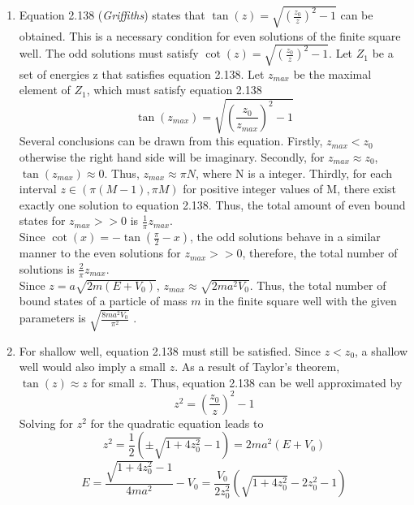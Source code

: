 \begin{sol}
\begin{enumerate}[label=\textbf{(\alph*)}]
	\item
    Equation 2.138 (\textit{Griffiths}) states that $\tan(z)=\sqrt{(\frac{z_0}{z})^2-1}$ can be obtained. This is a necessary condition for even solutions of the finite square well. The odd solutions must satisfy $\cot(z)=\sqrt{(\frac{z_0}{z})^2-1}$. Let $Z_1$ be a set of energies z that satisfies equation 2.138. Let $z_{max}$ be the maximal element of $Z_1$, which must satisfy equation 2.138
    $$\tan(z_{max})=\sqrt{(\frac{z_0}{z_{max}})^2-1}$$ Several conclusions can be drawn from this equation. Firstly, $z_{max}<z_0$ otherwise the right hand side will be imaginary. Secondly, for $z_{max}\approx z_0$, $\tan(z_{max})\approx 0$. Thus, $z_{max}\approx\pi N$, where N is a integer. Thirdly, for each interval $z\in(\pi (M-1), \pi M)$ for positive integer values of M, there exist exactly one solution to equation 2.138. Thus, the total amount of even bound states  for $z_{max}>>0$ is  $\frac{1}{\pi}z_{max}$.\\Since $\cot(x)=-\tan(\frac{\pi}{2}-x)$, the odd solutions behave in a similar manner to the even solutions for $z_{max}>>0$, therefore, the total number of solutions is $\frac{2}{\pi}z_{max}$.
    \\Since $z=a\sqrt{2m(E+V_0)}$, $z_{max}\approx \sqrt{2ma^2V_0}$. Thus, the total number of bound states of a particle of mass $m$ in the finite square well with the given parameters is $\displaystyle{\sqrt{\frac{8ma^2V_0}{\pi^2}}}$ .
    \item For shallow well, equation 2.138 must still be satisfied. Since $z<z_0$, a shallow well would also imply a small $z$. As a result of Taylor's theorem, $\tan(z)\approx z$ for small $z$. Thus, equation 2.138 can be well approximated by
    $$z^2=(\frac{z_0}{z})^2-1$$ Solving for $z^2$ for the quadratic equation leads to $$z^2=\frac{1}{2}(\pm\sqrt{1+4z_0 ^2}-1)=2ma^2(E+V_0) $$ $$E=\frac{\sqrt{1+4z_0 ^2}-1}{4ma^2}-V_0=\frac{V_0}{2z_0^2}(\sqrt{1+4z_0 ^2}-2z_0^2-1)$$
\end{enumerate}
\end{sol}